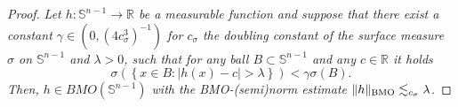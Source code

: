 \documentclass[11pt,a4paper,reqno]{amsart}
\theoremstyle{definition}
\newcommand{\R}{\mathbb{R}}
\newcommand{\Sn}{\mathbb{S}^{n-1}}
\numberwithin{komcounter}{section}
\begin{document}
\begin{proof}
\emph{Let $h:\Sn \to \R$ be a measurable function and suppose that there exist a constant $\gamma\in(0,(4c_{\sigma}^3)^{-1})$ for $c_{\sigma}$ the doubling constant of the surface measure $\sigma$ on $\Sn$ and $\lambda>0$, such that for any ball $B\subset \Sn$ and any $c\in \R$ it holds
\begin{equation}\label{aux2-thm:log-bmo}
 \sigma\left(\left\{x\in B: |h(x)-c|>\lambda \right\}\right)<\gamma\sigma(B).
\end{equation}
Then, $h \in BMO(\Sn)$ with the BMO-(semi)norm estimate $\|h\|_{{\rm BMO}}\lesssim_{c_{\sigma}} \lambda$.
}


\end{proof}
\end{document}
